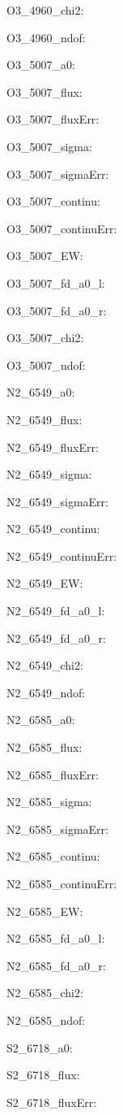 \item O3\_4960\_chi2: 
\item O3\_4960\_ndof: 
\item O3\_5007\_a0: 
\item O3\_5007\_flux: 
\item O3\_5007\_fluxErr: 
\item O3\_5007\_sigma: 
\item O3\_5007\_sigmaErr: 
\item O3\_5007\_continu: 
\item O3\_5007\_continuErr: 
\item O3\_5007\_EW: 
\item O3\_5007\_fd\_a0\_l: 
\item O3\_5007\_fd\_a0\_r: 
\item O3\_5007\_chi2: 
\item O3\_5007\_ndof: 
\item N2\_6549\_a0: 
\item N2\_6549\_flux: 
\item N2\_6549\_fluxErr: 
\item N2\_6549\_sigma: 
\item N2\_6549\_sigmaErr: 
\item N2\_6549\_continu: 
\item N2\_6549\_continuErr: 
\item N2\_6549\_EW: 
\item N2\_6549\_fd\_a0\_l: 
\item N2\_6549\_fd\_a0\_r: 
\item N2\_6549\_chi2: 
\item N2\_6549\_ndof: 
\item N2\_6585\_a0: 
\item N2\_6585\_flux: 
\item N2\_6585\_fluxErr: 
\item N2\_6585\_sigma: 
\item N2\_6585\_sigmaErr: 
\item N2\_6585\_continu: 
\item N2\_6585\_continuErr: 
\item N2\_6585\_EW: 
\item N2\_6585\_fd\_a0\_l: 
\item N2\_6585\_fd\_a0\_r: 
\item N2\_6585\_chi2: 
\item N2\_6585\_ndof: 
\item S2\_6718\_a0: 
\item S2\_6718\_flux: 
\item S2\_6718\_fluxErr: 
